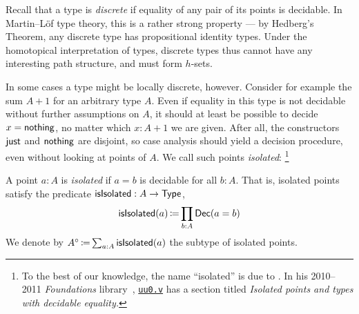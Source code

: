 Recall that a type is \emph{discrete} if equality of any pair of its points is decidable.
In Martin--Löf type theory, this is a rather strong property
---
by Hedberg's Theorem, any discrete type has propositional identity types.
Under the homotopical interpretation of types, discrete types thus cannot have any interesting path structure,
and must form \( h \)-sets.

In some cases a type might be locally discrete, however.
Consider for example the sum \( A + 1 \) for an arbitrary type \( A \).
Even if equality in this type is not decidable without further assumptions on \( A \),
it should at least be possible to decide \( x = \operatorname{\mathsf{nothing}} \), no matter which \( x : A + 1 \) we are given.
After all, the constructors \( \operatorname{\mathsf{just}} \) and \( \operatorname{\mathsf{nothing}} \) are disjoint,
so case analysis should yield a decision procedure, even without looking at points of \( A \).
We call such points \emph{isolated}:%
\footnote{%
  To the best of our knowledge,
  the name \enquote{isolated} is due to \citeauthor{Voevodsky2015experimentallibraryformalized}.
  In his 2010--2011 \emph{Foundations} library~\cite{Voevodsky2015experimentallibraryformalized},
  \href{https://www.math.ias.edu/~vladimir/Foundations_library/uu0.html\#lab67}{\texttt{uu0.v}}
  has a section titled \emph{Isolated points and types with decidable equality.}
}
\begin{definition}
  A point \( a : A \) is \emph{isolated} if \( a = b \) is decidable for all \( b : A \).
  That is, isolated points satisfy the predicate \( \operatorname{\mathsf{isIsolated}} : A \to \operatorname{\mathsf{Type}} \),
  \[
    \operatorname{\mathsf{isIsolated}}(a) \operatorname{\mathrel{\coloneq}} \prod_{b : A} \mathsf{Dec}(a = b)
  \]
  We denote by
  \(
    A^{\circ} \operatorname{\mathrel{\coloneq}} \sum_{a : A} \operatorname{\mathsf{isIsolated}}(a)
  \)
  the subtype of isolated points.
\end{definition}

